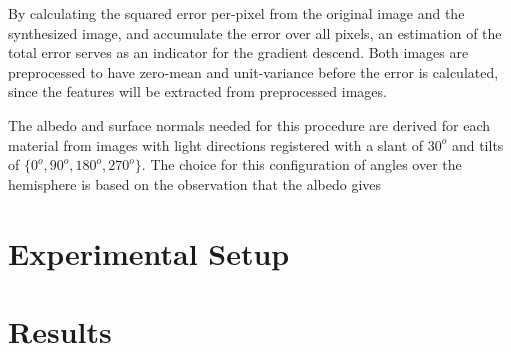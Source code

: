 By calculating the squared error per-pixel from the original image and the synthesized image, and accumulate the error over all pixels, an estimation of the total error serves as an indicator for the gradient descend. Both images are preprocessed to have zero-mean and unit-variance before the error is calculated, since the features will be extracted from preprocessed images.

The albedo and surface normals needed for this procedure are derived for each material from images with light directions registered with a slant of $30^o$ and tilts of $\{0^o, 90^o, 180^o, 270^o\}$. The choice for this configuration of angles over the hemisphere is based on the observation that the albedo gives 



\section{Experimental Setup}\label{sec:Experiments}



\section{Results}\label{sec:Results}

